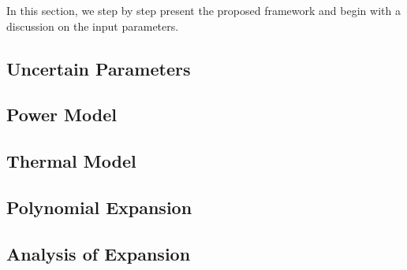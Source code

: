 In this section, we step by step present the proposed framework and begin with a discussion on the input parameters.

\subsection{Uncertain Parameters} 


\subsection{Power Model} 


\subsection{Thermal Model} 


\subsection{Polynomial Expansion} 


\subsection{Analysis of Expansion}

